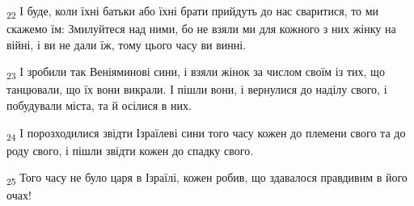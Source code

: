 \begin{tcolorbox}
\textsubscript{22} І буде, коли їхні батьки або їхні брати прийдуть до нас сваритися, то ми скажемо їм: Змилуйтеся над ними, бо не взяли ми для кожного з них жінку на війні, і ви не дали їж, тому цього часу ви винні.
\end{tcolorbox}
\begin{tcolorbox}
\textsubscript{23} І зробили так Веніяминові сини, і взяли жінок за числом своїм із тих, що танцювали, що їх вони викрали. І пішли вони, і вернулися до наділу свого, і побудували міста, та й осілися в них.
\end{tcolorbox}
\begin{tcolorbox}
\textsubscript{24} І порозходилися звідти Ізраїлеві сини того часу кожен до племени свого та до роду свого, і пішли звідти кожен до спадку свого.
\end{tcolorbox}
\begin{tcolorbox}
\textsubscript{25} Того часу не було царя в Ізраїлі, кожен робив, що здавалося правдивим в його очах!
\end{tcolorbox}
